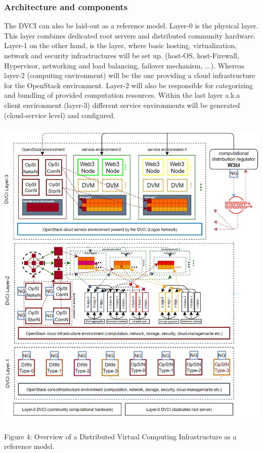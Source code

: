 \documentclass[]{article}
\begin{document}
\subsubsection{Architecture and components}
The DVCI can also be laid-out as a reference model.
Layer-0 is the physical layer.
This layer combines dedicated root servers and distributed community hardware. 
Layer-1 on the other hand, is the layer, where basic hosting, virtualization, network and security infrastructures will be set up. (host-OS, host-Firewall, Hypervisor, networking and load balancing, failover mechanism, ...).
Whereas layer-2 (computing environment) will be the one providing a cloud infrastructure for the OpenStack environment.
Layer-2 will also be responsible for categorizing and bundling of provided computation resources.
Within the last layer a.k.a client environment (layer-3) different service environments will be generated (cloud-service level) and configured.

\begin{center}
	\includegraphics[height=15.4cm]{dvci-layers}
\end{center}
\begin{center}
	Figure 4: Overview of a Distributed Virtual Computing Infrastructure as a reference model.
\end{center}
\end{document}
